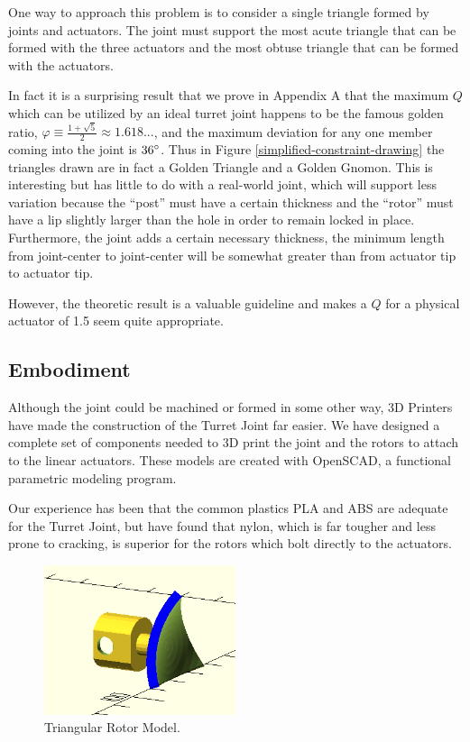 \documentclass[11pt]{article}
\begin{document}
One way to approach this problem is to consider a single triangle formed by joints and actuators.
The joint must support the most acute triangle
that can be formed with the three actuators and the most obtuse triangle that can be formed with the actuators.

In fact it is a surprising result that we prove in Appendix A that the maximum $Q$ which can be utilized
by an ideal turret joint happens to be
the famous golden ratio, $\varphi \equiv \frac{1 + \sqrt{5}}{2} \approx 1.618...$, and the maximum deviation for any one member coming
into the joint is $36\degree$.
Thus in Figure \ref{simplified-constraint-drawing} the triangles drawn are in fact a Golden Triangle and a Golden Gnomon.
This is interesting but has little to
do with a real-world joint, which will support less variation because the ``post'' must have a
certain thickness and the ``rotor'' must have a lip
slightly larger than the hole in order to remain locked in place.
Furthermore, the joint adds a certain necessary thickness, the minimum length
 from joint-center to joint-center will be somewhat greater than from actuator tip to actuator tip.

 However, the theoretic result is a valuable guideline and makes a $Q$ for a physical actuator of 1.5 seem quite appropriate.

 \subsection{Embodiment}

 Although the joint could be machined or formed in some other way,
 3D Printers have made the construction of the Turret Joint far easier.
 We have designed a complete set of components needed to 3D print the joint and the rotors to attach to
 the linear actuators. These models are created with OpenSCAD, a functional parametric modeling program.

 Our experience has been that the common plastics PLA and ABS are adequate for the Turret Joint,
 but have found that nylon, which is far tougher and less prone to cracking, is superior for the
 rotors which bolt directly to the actuators.

 \begin{figure}[H]
  \centering
    \includegraphics[width=0.5\textwidth]{figures/RotorModel.png}
    \caption[Triangular Rotor Model]{Triangular Rotor Model.}
      \label{rotormodel}
\end{figure}
\end{document}
